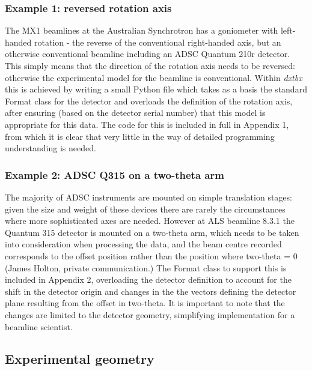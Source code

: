 \documentclass[preprint]{iucr}
\newcommand{\dxtbx}{\emph{dxtbx}\xspace}
\begin{document}
\subsubsection{Example 1: reversed rotation axis}

The MX1 beamlines at the Australian Synchrotron has a goniometer with 
left-handed rotation - the reverse of the conventional right-handed axis, but an 
otherwise conventional beamline including an ADSC Quantum 210r detector. This 
simply means that the direction of the rotation axis needs to be reversed: 
otherwise the experimental model for the beamline is conventional. Within \dxtbx 
this is achieved by writing a small Python file which takes as a basis the 
standard Format class for the detector and overloads the definition of the 
rotation axis, after ensuring (based on the detector serial number) that this 
model is appropriate for this data. The code for this is included in full in 
Appendix 1, from which it is clear that very little in the way of detailed 
programming understanding is needed.

\subsubsection{Example 2: ADSC Q315 on a two-theta arm}

The majority of ADSC instruments are mounted on simple translation stages: given 
the size and weight of these devices there are rarely the circumstances where 
more sophisticated axes are needed. However at ALS beamline 8.3.1 the Quantum 
315 detector is mounted on a two-theta arm, which needs to be taken into 
consideration when processing the data, and the beam centre recorded corresponds 
to the offset position rather than the position where two-theta = 0 
(James Holton, private communication.) The Format class to support this is 
included in Appendix 2, overloading the detector definition to account for the 
shift in the detector origin and changes in the the vectors defining the detector 
plane resulting from the offset in two-theta. It is important to note that the 
changes are limited to the detector geometry, simplifying implementation for a 
beamline scientist.

\subsection{Experimental geometry}
\end{document}
